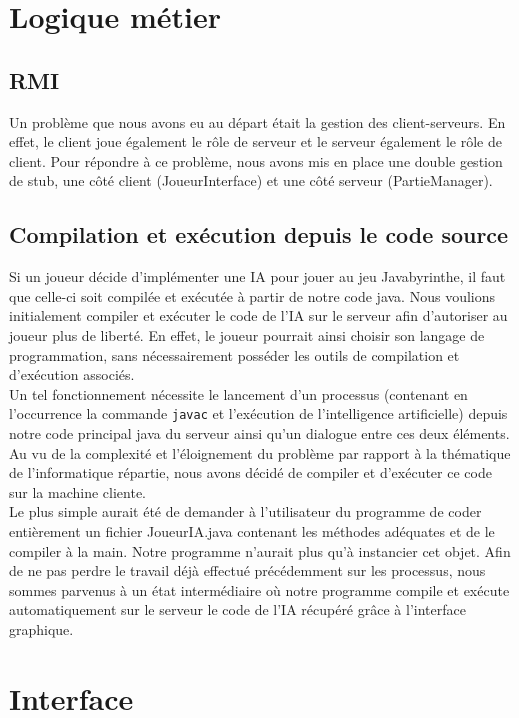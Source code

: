 \section{Logique métier}

    \subsection{RMI}
        Un problème que nous avons eu au départ était la gestion des client-serveurs. En effet, le client joue également le rôle de serveur et le serveur également le rôle de client. Pour répondre à ce problème, nous avons mis en place une double gestion de stub, une côté client (JoueurInterface) et une côté serveur (PartieManager).

    \subsection{Compilation et exécution depuis le code source}
        Si un joueur décide d'implémenter une IA pour jouer au jeu Javabyrinthe, il faut que celle-ci soit compilée et exécutée à partir de notre code java. Nous voulions initialement compiler et exécuter le code de l'IA sur le serveur afin d'autoriser au joueur plus de liberté. En effet, le joueur pourrait ainsi choisir son langage de programmation, sans nécessairement posséder les outils de compilation et d'exécution associés.\\
		
		Un tel fonctionnement nécessite le lancement d'un processus (contenant en l'occurrence la commande \texttt{javac} et l'exécution de l'intelligence artificielle) depuis notre code principal java du serveur ainsi qu'un dialogue entre ces deux éléments. Au vu de la complexité et l'éloignement du problème par rapport à la thématique de l'informatique répartie, nous avons décidé de compiler et d'exécuter ce code sur la machine cliente.\\
		
		Le plus simple aurait été de demander à l'utilisateur du programme de coder entièrement un fichier JoueurIA.java contenant les méthodes adéquates et de le compiler à la main. Notre programme n'aurait plus qu'à instancier cet objet. Afin de ne pas perdre le travail déjà effectué précédemment sur les processus, nous sommes parvenus à un état intermédiaire où notre programme compile et exécute automatiquement sur le serveur le code de l'IA récupéré grâce à l'interface graphique.


\section{Interface}
